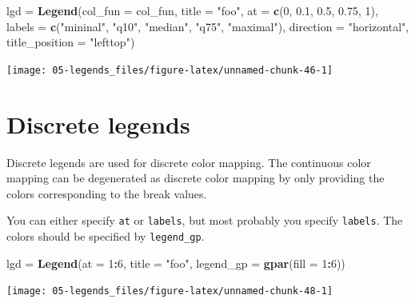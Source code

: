 \documentclass[]{book}
\newenvironment{Shaded}{\begin{snugshade}}{\end{snugshade}}
\newcommand{\KeywordTok}[1]{\textcolor[rgb]{0.13,0.29,0.53}{\textbf{#1}}}
\newcommand{\DataTypeTok}[1]{\textcolor[rgb]{0.13,0.29,0.53}{#1}}
\newcommand{\DecValTok}[1]{\textcolor[rgb]{0.00,0.00,0.81}{#1}}
\newcommand{\FloatTok}[1]{\textcolor[rgb]{0.00,0.00,0.81}{#1}}
\newcommand{\StringTok}[1]{\textcolor[rgb]{0.31,0.60,0.02}{#1}}
\newcommand{\OperatorTok}[1]{\textcolor[rgb]{0.81,0.36,0.00}{\textbf{#1}}}
\newcommand{\NormalTok}[1]{#1}
\theoremstyle{definition}
\theoremstyle{definition}
\theoremstyle{definition}
\theoremstyle{remark}
\begin{document}
\begin{Shaded}
\begin{Highlighting}[]
\NormalTok{lgd =}\StringTok{ }\KeywordTok{Legend}\NormalTok{(}\DataTypeTok{col_fun =}\NormalTok{ col_fun, }\DataTypeTok{title =} \StringTok{"foo"}\NormalTok{, }\DataTypeTok{at =} \KeywordTok{c}\NormalTok{(}\DecValTok{0}\NormalTok{, }\FloatTok{0.1}\NormalTok{, }\FloatTok{0.5}\NormalTok{, }\FloatTok{0.75}\NormalTok{, }\DecValTok{1}\NormalTok{),}
    \DataTypeTok{labels =} \KeywordTok{c}\NormalTok{(}\StringTok{"mininal"}\NormalTok{, }\StringTok{"q10"}\NormalTok{, }\StringTok{"median"}\NormalTok{, }\StringTok{"q75"}\NormalTok{, }\StringTok{"maximal"}\NormalTok{),}
    \DataTypeTok{direction =} \StringTok{"horizontal"}\NormalTok{, }\DataTypeTok{title_position =} \StringTok{"lefttop"}\NormalTok{)}
\end{Highlighting}
\end{Shaded}

\begin{center}\texttt{[image: 05-legends\_files/figure-latex/unnamed-chunk-46-1]} \end{center}

\section{Discrete legends}\label{discrete-legends}

Discrete legends are used for discrete color mapping. The continuous
color mapping can be degenerated as discrete color mapping by only
providing the colors corresponding to the break values.

You can either specify \texttt{at} or \texttt{labels}, but most probably
you specify \texttt{labels}. The colors should be specified by
\texttt{legend\_gp}.

\begin{Shaded}
\begin{Highlighting}[]
\NormalTok{lgd =}\StringTok{ }\KeywordTok{Legend}\NormalTok{(}\DataTypeTok{at =} \DecValTok{1}\OperatorTok{:}\DecValTok{6}\NormalTok{, }\DataTypeTok{title =} \StringTok{"foo"}\NormalTok{, }\DataTypeTok{legend_gp =} \KeywordTok{gpar}\NormalTok{(}\DataTypeTok{fill =} \DecValTok{1}\OperatorTok{:}\DecValTok{6}\NormalTok{))}
\end{Highlighting}
\end{Shaded}

\begin{center}\texttt{[image: 05-legends\_files/figure-latex/unnamed-chunk-48-1]} \end{center}
\end{document}
